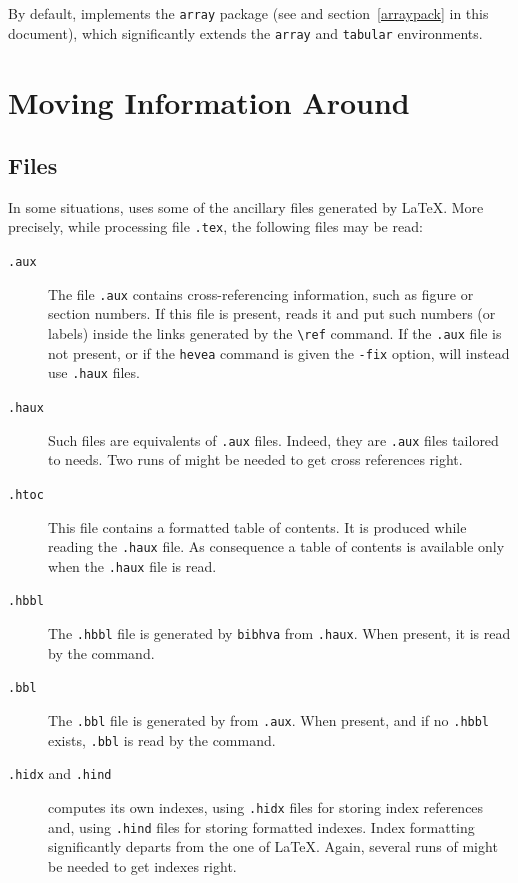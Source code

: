 By default, \hevea{} implements the \texttt{array} package
(see \cite[Section~5.3]{latexbis} and section~\ref{arraypack} in this
document), which significantly extends the
\verb+array+ and \verb+tabular+ environments.

\section{Moving Information Around}

\subsection{\label{files}Files}
In some situations,
\hevea{} uses some of the ancillary files generated by \LaTeX.
More precisely, while processing file \texttt{.tex},
the following files may be read:
\begin{description}
\item[\protect\texttt{.aux}] The file \texttt{.aux} contains
cross-referencing information, such as figure or section numbers.
If this file is present, \hevea{} reads it and put such numbers (or
labels) inside
the links generated by the \verb+\ref+ command. If the \texttt{.aux}
file is not present, or if the \texttt{hevea} command is given the
\texttt{-fix} option, \hevea{} will instead use \texttt{.haux}
files.
\item[\protect\texttt{.haux}] Such files are \hevea{} equivalents of
\texttt{.aux} files. Indeed, they are \texttt{.aux} files tailored to
\hevea{} needs.
Two runs of \hevea{} might be needed to get cross references right.
\item[\protect\texttt{.htoc}] This file contains a formatted table of
contents. It is produced while reading the \texttt{.haux} file.
As consequence a table of contents is available only when the
\texttt{.haux} file is read.


\item[\protect\texttt{.hbbl}] The \texttt{.hbbl} file
is generated by \texttt{bibhva} from \texttt{.haux}.
When present, it is read by the \verb++ command.

\item[\protect\texttt{.bbl}] The \texttt{.bbl} file is
generated by \BibTeX{} from \texttt{.aux}.
When present, and if no \texttt{.hbbl} exists,
\texttt{.bbl} is read by the \verb++ command.

\item[\protect\texttt{.hidx} and \protect\texttt{.hind}]
\hevea{} computes its own indexes, using \texttt{.hidx} files for
storing index references and, using \texttt{.hind} files
for storing formatted indexes.
Index formatting significantly departs from the one of \LaTeX{}.
Again, several runs of \hevea{} might be needed to get indexes right.
\end{description}

